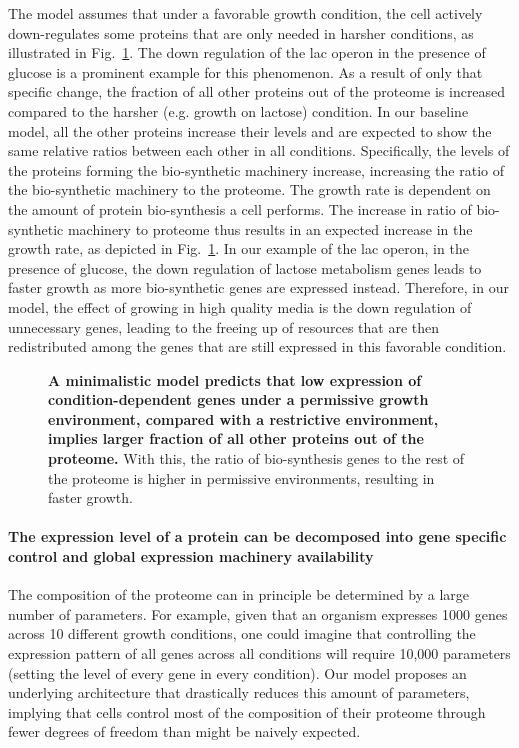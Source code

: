 \documentclass[10pt,letterpaper]{article}
\begin{document}
The model assumes that under a favorable growth condition, the cell actively down-regulates some proteins that are only needed in harsher conditions, as illustrated in Fig.~\ref{fig:model}.
The down regulation of the lac operon in the presence of glucose is a prominent example for this phenomenon.
As a result of only that specific change, the fraction of all other proteins out of the proteome is increased compared to the harsher (e.g. growth on lactose) condition.
In our baseline model, all the other proteins increase their levels and are expected to show the same relative ratios between each other in all conditions.
Specifically, the levels of the proteins forming the bio-synthetic machinery increase, increasing the ratio of the bio-synthetic machinery to the proteome.
The growth rate is dependent on the amount of protein bio-synthesis a cell performs.
The increase in ratio of bio-synthetic machinery to proteome thus results in an expected increase in the growth rate, as depicted in Fig.~\ref{fig:model}.
In our example of the lac operon, in the presence of glucose, the down regulation of lactose metabolism genes leads to faster growth as more bio-synthetic genes are expressed instead.
Therefore, in our model, the effect of growing in high quality media is the down regulation of unnecessary genes, leading to the freeing up of resources that are then redistributed among the genes that are still expressed in this favorable condition.

\begin{figure}[h]
\begin{center}
\caption{\label{fig:model}
{\bf A minimalistic model predicts that low expression of condition-dependent genes under a permissive growth environment, compared with a restrictive environment, implies larger fraction of all other proteins out of the proteome.}
With this, the ratio of bio-synthesis genes to the rest of the proteome is higher in permissive environments, resulting in faster growth.
%
}
\end{center}
\end{figure}

\paragraph{The expression level of a protein can be decomposed into gene specific control and global expression machinery availability}

The composition of the proteome can in principle be determined by a large number of parameters.
For example, given that an organism expresses 1000 genes across 10 different growth conditions, one could imagine that controlling the expression pattern of all genes across all conditions will require 10,000 parameters (setting the level of every gene in every condition).
Our model proposes an underlying architecture that drastically reduces this amount of parameters, implying that cells control most of the composition of their proteome through fewer degrees of freedom than might be naively expected.
\end{document}
